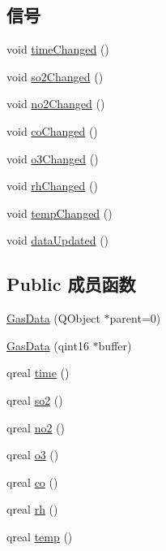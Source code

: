 \subsection*{信号}
\begin{DoxyCompactItemize}
\item 
void \hyperlink{class_gas_data_a0b0142d54233b7c659c3677a98ac6408}{time\+Changed} ()
\item 
void \hyperlink{class_gas_data_a88c01ec0f19987e146e488f3b797c415}{so2\+Changed} ()
\item 
void \hyperlink{class_gas_data_af274f1190089b70ef37f29cd0f99cf98}{no2\+Changed} ()
\item 
void \hyperlink{class_gas_data_a6ae59169bddd89f6d5a343e09d0fafb9}{co\+Changed} ()
\item 
void \hyperlink{class_gas_data_a0dbd3935dd960ee64f923b289da91534}{o3\+Changed} ()
\item 
void \hyperlink{class_gas_data_aca9ccae43ed434f654b2bdd785ba5088}{rh\+Changed} ()
\item 
void \hyperlink{class_gas_data_a99353a1207bea33ba06d5f36c0607c56}{temp\+Changed} ()
\item 
void \hyperlink{class_gas_data_af2b0284599635c7eecdb221d5b2b4f14}{data\+Updated} ()
\end{DoxyCompactItemize}
\subsection*{Public 成员函数}
\begin{DoxyCompactItemize}
\item 
\hyperlink{class_gas_data_ad2c93e20d8bc78ed424620a7cda0eaf3}{Gas\+Data} (Q\+Object $\ast$parent=0)
\item 
\hyperlink{class_gas_data_af8180388cf3d05085350be220defcfe6}{Gas\+Data} (qint16 $\ast$buffer)
\item 
qreal \hyperlink{class_gas_data_a0bd45899366f0c1aef068ff36e58cf40}{time} ()
\item 
qreal \hyperlink{class_gas_data_a1bb0e9b83b219aee6056cba5b95d6e57}{so2} ()
\item 
qreal \hyperlink{class_gas_data_ab60937b48c6f7bb235ac039ca144e1dc}{no2} ()
\item 
qreal \hyperlink{class_gas_data_a96adbc847434323af3b5d9f519d3897e}{o3} ()
\item 
qreal \hyperlink{class_gas_data_a0b28ed478992c372ea7a4f78e4c2435f}{co} ()
\item 
qreal \hyperlink{class_gas_data_a12dbcfe821d2c16caf9743842dc3ef4a}{rh} ()
\item 
qreal \hyperlink{class_gas_data_a5841654a877a78d2e511d0c47d931f45}{temp} ()
\end{DoxyCompactItemize}
